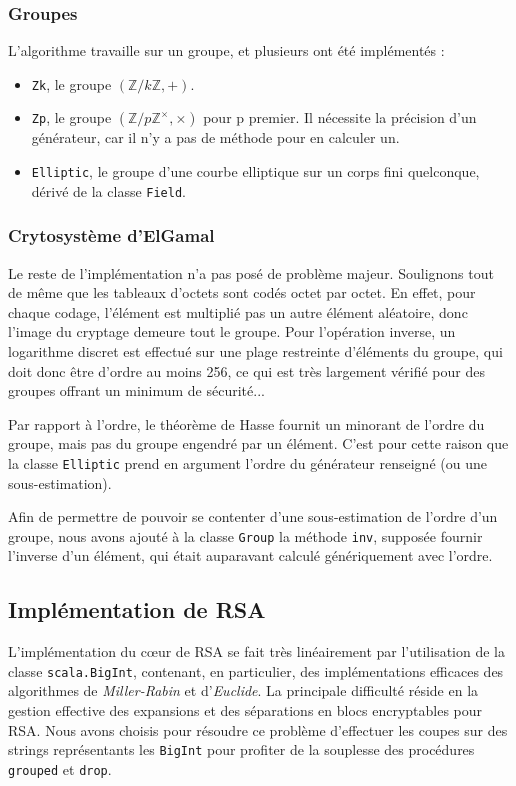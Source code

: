 \documentclass[11pt]{article} %
\begin{document}
\subsubsection{Groupes}

L'algorithme travaille sur un groupe, et plusieurs ont été implémentés :
\begin{itemize}
  \item \texttt{Zk}, le groupe $(\mathbb{Z}/k\mathbb{Z}, +)$.
  \item \texttt{Zp}, le groupe $(\mathbb{Z}/p\mathbb{Z}^\times, \times)$ pour p premier. Il nécessite la précision d'un générateur, car il n'y a pas de méthode pour en calculer un.
  \item \texttt{Elliptic}, le groupe d'une courbe elliptique sur un corps fini quelconque, dérivé de la classe \texttt{Field}.
\end{itemize}

\subsubsection{Crytosystème d'ElGamal}

Le reste de l'implémentation n'a pas posé de problème majeur. Soulignons tout de même que les tableaux d'octets sont codés octet par octet. En effet, pour chaque codage, l'élément est multiplié pas un autre élément aléatoire, donc l'image du cryptage demeure tout le groupe. Pour l'opération inverse, un logarithme discret est effectué sur une plage restreinte d'éléments du groupe, qui doit donc être d'ordre au moins 256, ce qui est très largement vérifié pour des groupes offrant un minimum de sécurité...

Par rapport à l'ordre, le  théorème de Hasse fournit un minorant de l'ordre du groupe, mais pas du groupe engendré par un élément. C'est pour cette raison que la classe \texttt{Elliptic} prend en argument l'ordre du générateur renseigné (ou une sous-estimation).

Afin de permettre de pouvoir se contenter d'une sous-estimation de l'ordre d'un groupe, nous avons ajouté à la classe \texttt{Group} la méthode \texttt{inv}, supposée fournir l'inverse d'un élément, qui était auparavant calculé génériquement avec l'ordre.

\subsection{Implémentation de RSA}

L'implémentation du cœur de RSA se fait très linéairement par l'utilisation de la classe \texttt{scala.BigInt}, contenant, en particulier, des implémentations efficaces des algorithmes de \emph{Miller-Rabin} et d'\emph{Euclide}. La principale difficulté réside en la gestion effective des expansions et des séparations en blocs encryptables pour RSA. Nous avons choisis pour résoudre ce problème d'effectuer les coupes sur des strings représentants les \texttt{BigInt} pour profiter de la souplesse des procédures \texttt{grouped} et \texttt{drop}.
\end{document}
